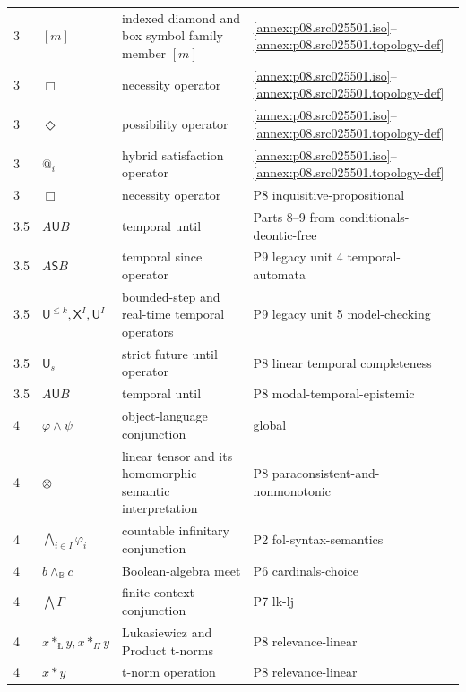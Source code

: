 \begin{longtable}{@{}p{}p{}p{}p{}@{}}
3 & \([m]\) & indexed diamond and box symbol family member \([m]\) & \hyperref[annex:p08.src025501.iso]{\ref*{annex:p08.src025501.iso}}--\hyperref[annex:p08.src025501.topology-def]{\ref*{annex:p08.src025501.topology-def}} \\
3 & \(\Box\) & necessity operator & \hyperref[annex:p08.src025501.iso]{\ref*{annex:p08.src025501.iso}}--\hyperref[annex:p08.src025501.topology-def]{\ref*{annex:p08.src025501.topology-def}} \\
3 & \(\Diamond\) & possibility operator & \hyperref[annex:p08.src025501.iso]{\ref*{annex:p08.src025501.iso}}--\hyperref[annex:p08.src025501.topology-def]{\ref*{annex:p08.src025501.topology-def}} \\
3 & \(@_i\) & hybrid satisfaction operator & \hyperref[annex:p08.src025501.iso]{\ref*{annex:p08.src025501.iso}}--\hyperref[annex:p08.src025501.topology-def]{\ref*{annex:p08.src025501.topology-def}} \\
3 & \(\Box\) & necessity operator & P8 inquisitive-propositional \\
3.5 & \(A\mathbin{\mathsf U}B\) & temporal until & Parts 8–9 from conditionals-deontic-free \\
3.5 & \(A\mathbin{\mathsf S}B\) & temporal since operator & P9 legacy unit 4 temporal-automata \\
3.5 & \(\mathsf U^{\leq k},\mathsf X^{I},\mathsf U^{I}\) & bounded-step and real-time temporal operators & P9 legacy unit 5 model-checking \\
3.5 & \(\mathsf U_s\) & strict future until operator & P8 linear temporal completeness \\
3.5 & \(A\mathbin{\mathsf U}B\) & temporal until & P8 modal-temporal-epistemic \\
4 & \(\varphi\land\psi\) & object-language conjunction & global \\
4 & \(\otimes\) & linear tensor and its homomorphic semantic interpretation & P8 paraconsistent-and-nonmonotonic \\
4 & \(\bigwedge_{i\in I}\varphi_i\) & countable infinitary conjunction & P2 fol-syntax-semantics \\
4 & \(b\wedge_{\mathbb B}c\) & Boolean-algebra meet & P6 cardinals-choice \\
4 & \(\bigwedge\Gamma\) & finite context conjunction & P7 lk-lj \\
4 & \(x\mathbin{\ast_{\text{\L}}}y,x\mathbin{\ast_{\Pi}}y\) & Lukasiewicz and Product t-norms & P8 relevance-linear \\
4 & \(x\ast y\) & t-norm operation & P8 relevance-linear \\

\end{longtable}
